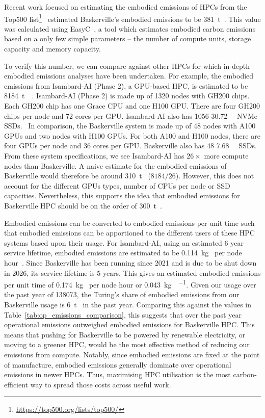 \documentclass[12pt]{article}
\newcommand{\cooe}{\ensuremath{\mathrm{CO}_2\mathrm{e}}}
\newcommand{\tcooe}[1]{\qty[qualifier-mode=combine]{#1}{\tonne\of{\cooe}}}
\begin{document}
Recent work focused on estimating the embodied emissions of HPCs from the Top500 list\footnote{\url{https://top500.org/lists/top500/}}~\cite{Rao_2025} estimated Baskerville's embodied emissions to be \tcooe{381}. This value was calculated using EasyC~\cite{easyc}, a tool which estimates embodied carbon emissions based on a only few simple parameters – the number of compute units, storage capacity and memory capacity.

To verify this number, we can compare against other HPCs for which in-depth embodied emissions analyses have been undertaken. For example, the embodied emissions from Isambard-AI (Phase 2), a GPU-based HPC, is estimated to be \tcooe{8184}~\cite{isambard-ai_emissions}. Isambard-AI (Phase 2) is made up of \num{1320} nodes with GH200 chips. Each GH200 chip has one Grace CPU and one H100 GPU. There are four GH200 chips per node and \num{72} cores per GPU. Isambard-AI also has \num{1056} \qty{30.72}{\tera\byte} NVMe SSDs.~\cite{isambard-ai_specs} In comparison, the Baskerville system is made up of \num{48} nodes with A100 GPUs and two nodes with H100 GPUs. For both A100 and H100 nodes, there are four GPUs per node and \num{36} cores per GPU. Baskerville also has \num{48} \qty{7.68}{\tera\byte} SSDs. From these system specifications, we see Isambard-AI has $26\times$ more compute nodes than Baskerville. A naive estimate for the embodied emissions of Baskerville would therefore be around \tcooe{310} ($8184/26$). However, this does not account for the different GPUs types, number of CPUs per node or SSD capacities. Nevertheless, this supports the idea that embodied emissions for Baskerville HPC should be on the order of \tcooe{300}. 

Embodied emissions can be converted to embodied emissions per unit time such that embodied emissions can be apportioned to the different users of these HPC systems based upon their usage. For Isambard-AI, using an estimated 6 year service lifetime, embodied emissions are estimated to be \qty[qualifier-mode=combine]{0.114}{\kilogram\of{\cooe}} per node hour~\cite{isambard-ai_emissions, archer2_sustainability}.
Since Baskerville has been running since 2021 and is due to be shut down in 2026, its service lifetime is 5 years. 
This gives an estimated embodied emissions per unit time of \qty[qualifier-mode=combine]{0.174}{\kilogram\of{\cooe}} per node hour or \qty[qualifier-mode=combine]{0.043}{\kilogram\of{\cooe}\per\GPUh}.
Given our usage over the past year of \qty{138073}{\GPUh}, the Turing's share of embodied emissions from our Baskerville usage is \tcooe{6} in the past year.
Comparing this against the values in Table~\ref{tab:op_emissions_comparison}, this suggests that over the past year operational emissions outweighed embodied emissions for Baskerville HPC. This means that pushing for Baskerville to be powered by renewable electricity, or moving to a greener HPC, would be the most effective method of reducing our emissions from compute. Notably, since embodied emissions are fixed at the point of manufacture, embodied emissions generally dominate over operational emissions in newer HPCs. Thus, maximising HPC utilisation is the most carbon-efficient way to spread those costs across useful work.
\end{document}
